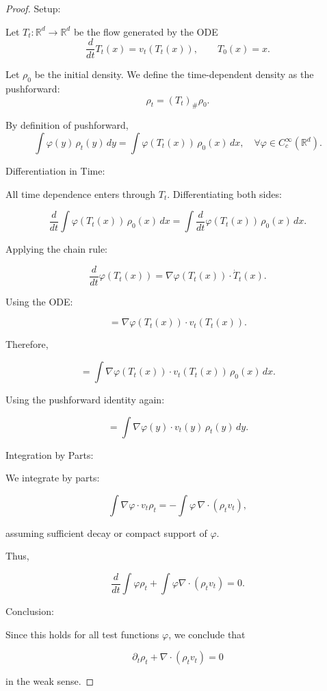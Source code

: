 \begin{enumerate}
\begin{proof}
        Setup:

        Let $T_t : \mathbb{R}^d \to \mathbb{R}^d$ be the flow generated by the ODE
        \[
        \frac{d}{dt}T_t(x) = v_t(T_t(x)),
        \qquad T_0(x)=x.
        \]

        Let $\rho_0$ be the initial density.  
        We define the time-dependent density as the pushforward:
        \[
        \rho_t = (T_t)_\# \rho_0.
        \]

        By definition of pushforward,
        \[
        \int \varphi(y)\,\rho_t(y)\,dy
        =
        \int \varphi(T_t(x))\,\rho_0(x)\,dx,
        \quad \forall \varphi \in C_c^\infty(\mathbb{R}^d).
        \]

        Differentiation in Time:

        All time dependence enters through $T_t$.  
        Differentiating both sides:

        \[
        \frac{d}{dt}
        \int \varphi(T_t(x))\,\rho_0(x)\,dx
        =
        \int
        \frac{d}{dt}\varphi(T_t(x))\,\rho_0(x)\,dx.
        \]

        Applying the chain rule:

        \[
        \frac{d}{dt}\varphi(T_t(x))
        =
        \nabla\varphi(T_t(x)) \cdot \dot{T}_t(x).
        \]

        Using the ODE:

        \[
        =
        \nabla\varphi(T_t(x)) \cdot v_t(T_t(x)).
        \]

        Therefore,

        \[
        =
        \int
        \nabla\varphi(T_t(x)) \cdot v_t(T_t(x))\,\rho_0(x)\,dx.
        \]

        Using the pushforward identity again:

        \[
        =
        \int
        \nabla\varphi(y) \cdot v_t(y)\,\rho_t(y)\,dy.
        \]

        Integration by Parts:

        We integrate by parts:

        \[
        \int
        \nabla\varphi \cdot v_t \rho_t
        =
        -
        \int
        \varphi \, \nabla\cdot(\rho_t v_t),
        \]

        assuming sufficient decay or compact support of $\varphi$.

        Thus,

        \[
        \frac{d}{dt}
        \int \varphi \rho_t
        +
        \int
        \varphi \nabla\cdot(\rho_t v_t)
        =
        0.
        \]

        Conclusion:

        Since this holds for all test functions $\varphi$, we conclude that

        \[
        \partial_t \rho_t + \nabla\cdot(\rho_t v_t)=0
        \]

        in the weak sense.

    
    \end{proof}


\end{enumerate}


